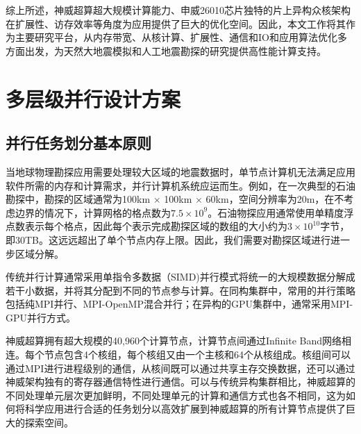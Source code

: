 综上所述，神威超算超大规模计算能力、申威26010芯片独特的片上异构众核架构在扩展性、访存效率等角度为应用提供了巨大的优化空间。因此，本文工作将其作为主要研究平台，从内存带宽、从核计算、扩展性、通信和IO和应用算法优化多方面出发，为天然大地震模拟和人工地震勘探的研究提供高性能计算支持。

\section{多层级并行设计方案}
\label{sec:多层级并行设计方案}

\subsection{并行任务划分基本原则}

当地球物理勘探应用需要处理较大区域的地震数据时，单节点计算机无法满足应用软件所需的内存和计算需求，并行计算机系统应运而生。例如，在一次典型的石油勘探中，勘探的区域通常为100km $\times$ 100km $\times$ 60km，空间分辨率为20m，在不考虑边界的情况下，计算网格的格点数为$7.5\times10^9$。石油物探应用通常使用单精度浮点数表示每个格点，因此每个表示完成勘探区域的数组的大小约为$3\times10^10$字节，即30TB。这远远超出了单个节点内存上限。因此，我们需要对勘探区域进行进一步区域分解。

传统并行计算通常采用单指令多数据（SIMD)并行模式将统一的大规模数据分解成若干小数据，并将其分配到不同的节点参与计算。在同构集群中，常用的并行策略包括纯MPI并行、MPI-OpenMP混合并行；在异构的GPU集群中，通常采用MPI-GPU并行方式。

神威超算拥有超大规模的40,960个计算节点，计算节点间通过Infinite Band网络相连。每个节点包含4个核组，每个核组又由一个主核和64个从核组成。核组间可以通过MPI进行进程级别的通信，从核间既可以通过共享主存交换数据，还可以通过神威架构独有的寄存器通信特性进行通信。可以与传统异构集群相比，神威超算的不同处理单元层次更加鲜明，不同处理单元的计算和通信方式也各不相同，这为如何将科学应用进行合适的任务划分以高效扩展到神威超算的所有计算节点提供了巨大的探索空间。

